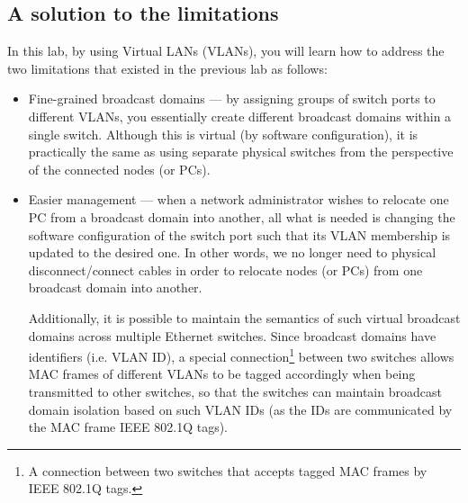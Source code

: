 \documentclass[pdftex,12pt,a4paper]{article}
\begin{document}
        \subsection{A solution to the limitations}
            In this lab, by using Virtual LANs (VLANs), you will learn how to
            address the two limitations that existed in the previous lab as
            follows:
            \begin{itemize}
                \item Fine-grained broadcast domains --- by assigning groups of
                    switch ports to different VLANs, you essentially create
                    different broadcast domains within a single switch. Although
                    this is virtual (by software configuration), it is practically
                    the same as using separate physical switches from the
                    perspective of the connected nodes (or PCs).
                \item Easier management --- when a network administrator wishes to
                    relocate one PC from a broadcast domain into another, all what
                    is needed is changing the software configuration of the switch
                    port such that its VLAN membership is updated to the desired
                    one. In other words, we no longer need to physical
                    disconnect/connect cables in order to relocate nodes (or PCs)
                    from one broadcast domain into another.

                    Additionally, it is possible to maintain the semantics of such
                    virtual broadcast domains across multiple Ethernet switches.
                    Since broadcast domains have identifiers (i.e. VLAN ID), a
                    special connection\footnote{A connection between two switches
                    that accepts tagged MAC frames by IEEE 802.1Q tags.} between
                    two switches allows MAC frames of different VLANs to be tagged
                    accordingly when being transmitted to other switches, so that
                    the switches can maintain broadcast domain isolation based on
                    such VLAN IDs (as the IDs are communicated by the MAC frame
                    IEEE 802.1Q tags).
            \end{itemize}
\end{document}
